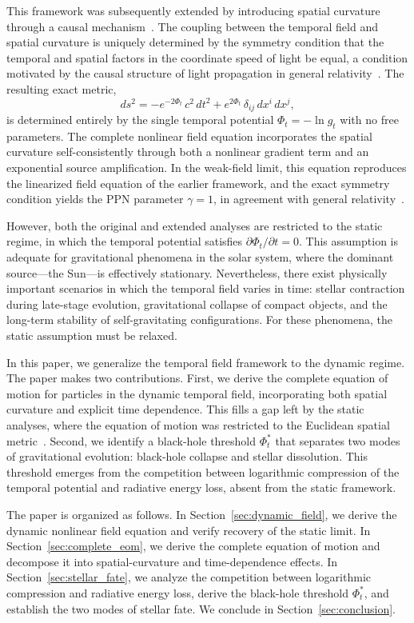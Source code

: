 \documentclass[12pt]{article}
\begin{document}
This framework was subsequently extended by introducing spatial curvature through a causal mechanism~\cite{Gwak2026b}. The coupling between the temporal field and spatial curvature is uniquely determined by the symmetry condition that the temporal and spatial factors in the coordinate speed of light be equal, a condition motivated by the causal structure of light propagation in general relativity~\cite{Hawking1973}. The resulting exact metric,
$$
ds^2 = -e^{-2\Phi_t}\,c^2\,dt^2 + e^{2\Phi_t}\,\delta_{ij}\,dx^i\,dx^j,
\label{eq:exact_metric}
$$
is determined entirely by the single temporal potential $\Phi_t = -\ln g_t$ with no free parameters. The complete nonlinear field equation incorporates the spatial curvature self-consistently through both a nonlinear gradient term and an exponential source amplification. In the weak-field limit, this equation reproduces the linearized field equation of the earlier framework, and the exact symmetry condition yields the PPN parameter $\gamma = 1$, in agreement with general relativity~\cite{Will2014}.

However, both the original and extended analyses are restricted to the static regime, in which the temporal potential satisfies $\partial\Phi_t/\partial t = 0$. This assumption is adequate for gravitational phenomena in the solar system, where the dominant source---the Sun---is effectively stationary. Nevertheless, there exist physically important scenarios in which the temporal field varies in time: stellar contraction during late-stage evolution, gravitational collapse of compact objects, and the long-term stability of self-gravitating configurations. For these phenomena, the static assumption must be relaxed.

In this paper, we generalize the temporal field framework to the dynamic regime. The paper makes two contributions. First, we derive the complete equation of motion for particles in the dynamic temporal field, incorporating both spatial curvature and explicit time dependence. This fills a gap left by the static analyses, where the equation of motion was restricted to the Euclidean spatial metric~\cite{Gwak2026a}. Second, we identify a black-hole threshold $\Phi_t^*$ that separates two modes of gravitational evolution: black-hole collapse and stellar dissolution. This threshold emerges from the competition between logarithmic compression of the temporal potential and radiative energy loss, absent from the static framework.

The paper is organized as follows. In Section~\ref{sec:dynamic_field}, we derive the dynamic nonlinear field equation and verify recovery of the static limit. In Section~\ref{sec:complete_eom}, we derive the complete equation of motion and decompose it into spatial-curvature and time-dependence effects. In Section~\ref{sec:stellar_fate}, we analyze the competition between logarithmic compression and radiative energy loss, derive the black-hole threshold $\Phi_t^*$, and establish the two modes of stellar fate. We conclude in Section~\ref{sec:conclusion}.
\end{document}
